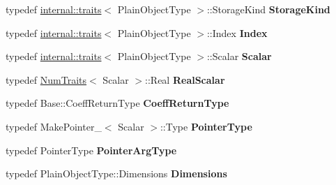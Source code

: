 \begin{DoxyCompactItemize}
\item 
\mbox{\label{class_eigen_1_1_tensor_map_a9de04f8c9f73a456268cc0998bf798d6}} 
typedef \hyperlink{struct_eigen_1_1internal_1_1traits}{internal\+::traits}$<$ Plain\+Object\+Type $>$\+::Storage\+Kind {\bfseries Storage\+Kind}
\item 
\mbox{\label{class_eigen_1_1_tensor_map_ad4ffcc95e793688f3c5c58f90ccbd476}} 
typedef \hyperlink{struct_eigen_1_1internal_1_1traits}{internal\+::traits}$<$ Plain\+Object\+Type $>$\+::Index {\bfseries Index}
\item 
\mbox{\label{class_eigen_1_1_tensor_map_aa21e8ca54c18ec42d33f38a2787a89b3}} 
typedef \hyperlink{struct_eigen_1_1internal_1_1traits}{internal\+::traits}$<$ Plain\+Object\+Type $>$\+::Scalar {\bfseries Scalar}
\item 
\mbox{\label{class_eigen_1_1_tensor_map_ac92362b6f148ed90c683631f2d56f7cd}} 
typedef \hyperlink{group___core___module_struct_eigen_1_1_num_traits}{Num\+Traits}$<$ Scalar $>$\+::Real {\bfseries Real\+Scalar}
\item 
\mbox{\label{class_eigen_1_1_tensor_map_acff28fd324083a21768f634e5c15581e}} 
typedef Base\+::\+Coeff\+Return\+Type {\bfseries Coeff\+Return\+Type}
\item 
\mbox{\label{class_eigen_1_1_tensor_map_a528cd8312fd353888faab1a5b3279ffd}} 
typedef Make\+Pointer\+\_\+$<$ Scalar $>$\+::Type {\bfseries Pointer\+Type}
\item 
\mbox{\label{class_eigen_1_1_tensor_map_abd0e1e1d71703c60543d2dc57a23faa3}} 
typedef Pointer\+Type {\bfseries Pointer\+Arg\+Type}
\item 
\mbox{\label{class_eigen_1_1_tensor_map_a14f97cddfedd7156d2df6c1ccd7767cc}} 
typedef Plain\+Object\+Type\+::\+Dimensions {\bfseries Dimensions}
\end{DoxyCompactItemize}
